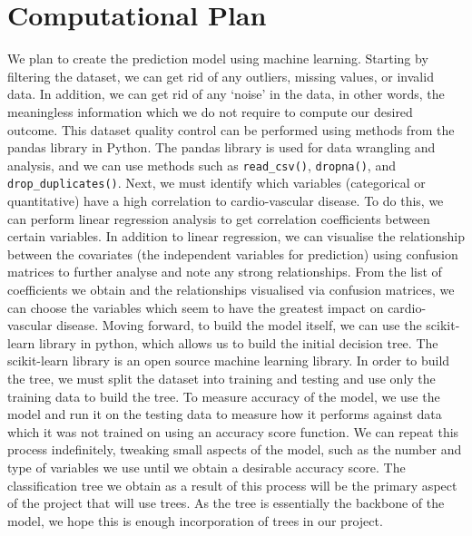\documentclass[fontsize=11pt]{article}
\begin{document}
\section*{Computational Plan}
We plan to create the prediction model using machine learning. Starting by filtering the dataset, we can get rid of any outliers, missing values, or invalid data. In addition, we can get rid of any ‘noise’ in the data, in other words, the meaningless information which we do not require to compute our desired outcome. This dataset quality control can be performed using methods from the pandas library in Python. The pandas library is used for data wrangling and analysis, and we can use methods such as \texttt{read\_csv()}, \texttt{dropna()}, and \texttt{drop\_duplicates()}.
\newline
\newline
Next, we must identify which variables (categorical or quantitative) have a high correlation to cardio-vascular disease. To do this, we can perform linear regression analysis to get correlation coefficients between certain variables. In addition to linear regression, we can visualise the relationship between the covariates (the independent variables for prediction) using confusion matrices to further analyse and note any strong relationships. From the list of coefficients we obtain and the relationships visualised via confusion matrices, we can choose the variables which seem to have the greatest impact on cardio-vascular disease. 
\newline
\newline
Moving forward, to build the model itself, we can use the scikit-learn library in python, which allows us to build the initial decision tree. The scikit-learn library is an open source machine learning library. In order to build the tree, we must split the dataset into training and testing and use only the training data to build the tree. To measure accuracy of the model, we use the model and run it on the testing data to measure how it performs against data which it was not trained on using an accuracy score function. We can repeat this process indefinitely, tweaking small aspects of the model, such as the number and type of variables we use until we obtain a desirable accuracy score. The classification tree we obtain as a result of this process will be the primary aspect of the project that will use trees. As the tree is essentially the backbone of the model, we hope this is enough incorporation of trees in our project. 
\newline
\newline
\end{document}

